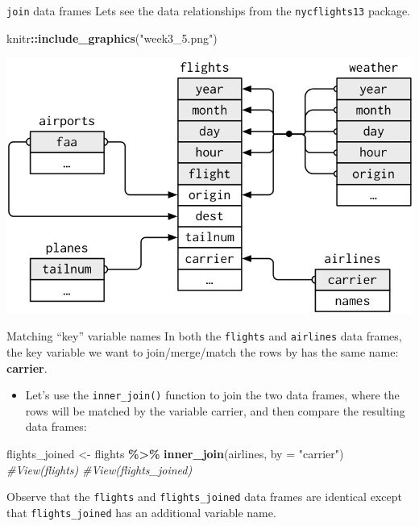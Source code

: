 \documentclass[
  ignorenonframetext,
]{beamer}
\newenvironment{Shaded}{\begin{snugshade}}{\end{snugshade}}
\newcommand{\AttributeTok}[1]{\textcolor[rgb]{0.13,0.29,0.53}{#1}}
\newcommand{\CommentTok}[1]{\textcolor[rgb]{0.56,0.35,0.01}{\textit{#1}}}
\newcommand{\FunctionTok}[1]{\textcolor[rgb]{0.13,0.29,0.53}{\textbf{#1}}}
\newcommand{\NormalTok}[1]{#1}
\newcommand{\OtherTok}[1]{\textcolor[rgb]{0.56,0.35,0.01}{#1}}
\newcommand{\SpecialCharTok}[1]{\textcolor[rgb]{0.81,0.36,0.00}{\textbf{#1}}}
\newcommand{\StringTok}[1]{\textcolor[rgb]{0.31,0.60,0.02}{#1}}
\providecommand{\tightlist}{%
  \setlength{\itemsep}{0pt}\setlength{\parskip}{0pt}}
\begin{document}
\begin{frame}[fragile]{\texttt{join} data frames}
\protect\hypertarget{join-data-frames-1}{}
Lets see the data relationships from the \texttt{nycflights13} package.

\begin{Shaded}
\begin{Highlighting}[]
\NormalTok{knitr}\SpecialCharTok{::}\FunctionTok{include\_graphics}\NormalTok{(}\StringTok{"week3\_5.png"}\NormalTok{)}
\end{Highlighting}
\end{Shaded}

\begin{center}\includegraphics[width=0.7\linewidth,height=0.5\textheight]{week3_5} \end{center}
\end{frame}

\begin{frame}[fragile]{Matching ``key'' variable names}
\protect\hypertarget{matching-key-variable-names}{}
In both the \texttt{flights} and \texttt{airlines} data frames, the key
variable we want to join/merge/match the rows by has the same name:
\textbf{carrier}.

\begin{itemize}
\tightlist
\item
  Let's use the \texttt{inner\_join()} function to join the two data
  frames, where the rows will be matched by the variable carrier, and
  then compare the resulting data frames:
\end{itemize}

\tiny

\begin{Shaded}
\begin{Highlighting}[]
\NormalTok{flights\_joined }\OtherTok{\textless{}{-}}\NormalTok{ flights }\SpecialCharTok{\%\textgreater{}\%} 
  \FunctionTok{inner\_join}\NormalTok{(airlines, }\AttributeTok{by =} \StringTok{"carrier"}\NormalTok{)}
\CommentTok{\#View(flights)}
\CommentTok{\#View(flights\_joined)}
\end{Highlighting}
\end{Shaded}

\normalsize

Observe that the \texttt{flights} and \texttt{flights\_joined} data
frames are identical except that \texttt{flights\_joined} has an
additional variable name.
\end{frame}
\end{document}
